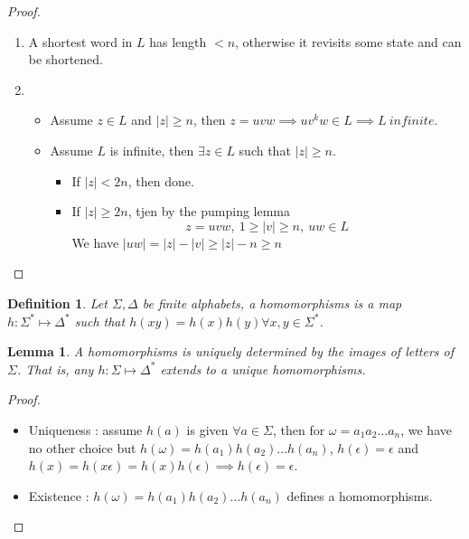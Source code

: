 \documentclass[a4paper,11pt]{article}
\newcommand{\white}[1]{{\textcolor{white}{#1}}}
\newtheorem{mydef}{Definition}
\newtheorem{lemma}{Lemma}[section]
\begin{document}
\begin{proof}
  \white{AD}
  \begin{enumerate}
  \item A shortest word in $L$ has length $< n$, otherwise it revisits some
    state and can be shortened.
  \item \begin{itemize}
    \item Assume $z \in L$ and $|z| \geq n$, then $z = uvw \implies uv^kw \in L
      \implies L\ infinite$.
    \item Assume $L$ is infinite, then $\exists z \in L$ such that $|z| \geq n$.
      \begin{itemize}
      \item If $|z| < 2n$, then done.
      \item If $|z| \geq 2n$, tjen by the pumping lemma
        \[
          z = uvw,\ 1 \geq |v| \geq n,\ uw \in L
        \]
        We have $|uw| = |z| - |v| \geq |z| - n \geq n$
      \end{itemize}
    \end{itemize}
  \end{enumerate}
\end{proof}

\begin{mydef}
  Let $\Sigma,\Delta$ be finite alphabets, a homomorphisms is a map $h :
  \Sigma^* \mapsto \Delta^*$ such that $h(xy) = h(x) h(y) \forall x,y \in \Sigma^*$.
\end{mydef}

\begin{lemma}
  A homomorphisms is uniquely determined by the images of letters of $\Sigma$.
  That is, any $h : \Sigma \mapsto \Delta^*$ extends to a unique homomorphisms.
\end{lemma}

\begin{proof}
  \white{Hello}
  \begin{itemize}
  \item Uniqueness : assume $h(a)$ is given $\forall a \in \Sigma$, then for
    $\omega = a_1a_2\dots a_n$, we have no other choice but $h(\omega) =
    h(a_1)h(a_2)\dots h(a_n)$, $h(\epsilon) = \epsilon$ and $h(x) = h(x\epsilon)
    = h(x)h(\epsilon) \implies h(\epsilon) = \epsilon$.
  \item Existence : $h(\omega) = h(a_1)h(a_2)\dots h(a_n)$ defines a homomorphisms.
  \end{itemize}
\end{proof}
\end{document}

